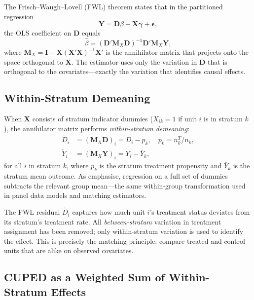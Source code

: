 \documentclass[12pt]{article}
\theoremstyle{plain}
\theoremstyle{definition}
\begin{document}
The Frisch--Waugh--Lovell (FWL) theorem \citep{frisch1933partial,
lovell1963seasonal} states that in the partitioned regression
\[
  \mathbf{Y} = \mathbf{D}\beta + \mathbf{X}\boldsymbol{\gamma} +
  \boldsymbol{\epsilon},
\]
the OLS coefficient on $\mathbf{D}$ equals
\begin{equation}
  \hat{\beta} =
    (\mathbf{D}'\mathbf{M}_X \mathbf{D})^{-1}
    \mathbf{D}'\mathbf{M}_X \mathbf{Y},
  \label{eq:fwl}
\end{equation}
where $\mathbf{M}_X = \mathbf{I} - \mathbf{X}(\mathbf{X}'\mathbf{X})^{-1}
\mathbf{X}'$ is the annihilator matrix that projects onto the space orthogonal
to $\mathbf{X}$.
The estimator uses only the variation in $\mathbf{D}$ that is orthogonal to
the covariates---exactly the variation that identifies causal effects.

\subsection{Within-Stratum Demeaning}

When $\mathbf{X}$ consists of stratum indicator dummies ($X_{ik} = 1$ if unit
$i$ is in stratum $k$), the annihilator matrix performs \emph{within-stratum
demeaning}:
\begin{align}
  \tilde{D}_i &= (\mathbf{M}_X \mathbf{D})_i = D_i - p_k,
    \quad p_k = n_k^T/n_k, \label{eq:treat_resid} \\
  \tilde{Y}_i &= (\mathbf{M}_X \mathbf{Y})_i = Y_i - \bar{Y}_k,
  \label{eq:out_resid}
\end{align}
for all $i$ in stratum $k$, where $p_k$ is the stratum treatment propensity
and $\bar{Y}_k$ is the stratum mean outcome.
As \citet[pp.~74--75]{angrist2009mostly} emphasise, regression on a full set
of dummies subtracts the relevant group mean---the same within-group
transformation used in panel data models and matching estimators.

The FWL residual $\tilde{D}_i$ captures how much unit $i$'s treatment
status deviates from its stratum's treatment rate.
All \emph{between-stratum} variation in treatment assignment has been removed;
only within-stratum variation is used to identify the effect.
This is precisely the matching principle: compare treated and control units
that are alike on observed covariates.

\subsection{CUPED as a Weighted Sum of Within-Stratum Effects}
\end{document}
